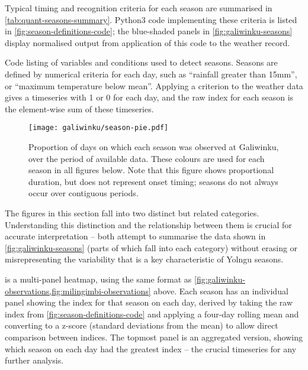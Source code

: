 Typical timing and recognition criteria for each season are summarised in
\cref{tab:quant-seasons-summary}.  Python3 code implementing these criteria
is listed in \cref{fig:season-definitions-code}; the blue-shaded panels in
\cref{fig:galiwinku-seasons} display normalised output from application of
this code to the weather record.

\begin{framedbox}
    
    \centering
    \caption[Python code: definition of season indices]{
        Code listing of variables and conditions used to detect seasons.
        Seasons are defined by numerical criteria for each day, such as
        ``rainfall greater than 15mm'', or ``maximum temperature below mean''.
        Applying a criterion to the weather data gives a timeseries with 1 or 0
        for each day, and the raw index for each season is the element-wise
        sum of these timeseries.}
    \label{fig:season-definitions-code}
\end{framedbox}


\begin{SCfigure}[][h]
    \centering
    \texttt{[image: galiwinku/season-pie.pdf]}
    \caption[Calculated season frequency, Galiwinku]{
        Proportion of days on which each season was observed at
        Galiwinku, over the period of available data.
        These colours are used for each season in all figures below.
        Note that this figure shows proportional duration, but does
        not represent onset timing; seasons do not always occur over
        contiguous periods.
        }
    \label{fig:galiwinku-season-pie}
\end{SCfigure}


The figures in this section fall into two distinct but related categories.
Understanding this distinction and the relationship between them is crucial
for accurate interpretation -- both attempt to summarise the data shown in
\cref{fig:galiwinku-seasons} (parts of which fall into each category) without
erasing or misrepresenting the variability that is a key characteristic of
Yolngu seasons.


 is a multi-panel heatmap, using the same format
as \cref{fig:galiwinku-observations,fig:milingimbi-observations} above.
Each season has an individual panel showing the index for that season on each
day, derived by taking the raw index from \cref{fig:season-definitions-code}
and applying a four-day rolling mean and converting to a z-score (standard
deviations from the mean) to allow direct comparison between indices.
%
The topmost panel is an aggregated version, showing which season on each day
had the greatest index -- the crucial timeseries for any further analysis.

